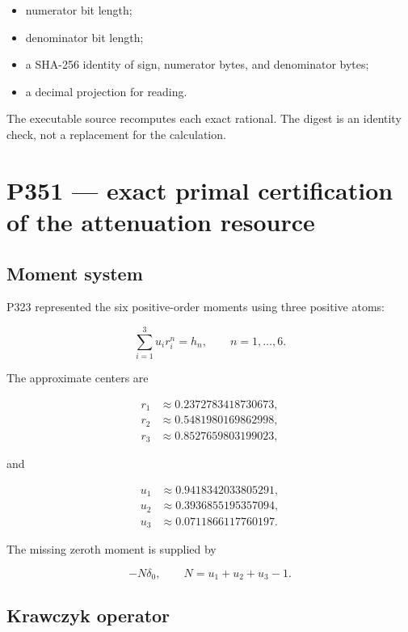 \documentclass[11pt,a4paper,openany]{report}
\begin{document}
\begin{itemize}
\item 
numerator bit length;

\item 
denominator bit length;

\item 
a SHA-256 identity of sign, numerator bytes, and denominator bytes;

\item 
a decimal projection for reading.

\end{itemize}

The executable source recomputes each exact rational. The digest is an identity check, not a replacement for the calculation.

\chapter{P351 --- exact primal certification of the attenuation resource}

\section{Moment system}

P323 represented the six positive-order moments using three positive atoms:

\[
\sum_{i=1}^{3}u_ir_i^n=h_n,
\qquad n=1,\ldots,6.
\]

The approximate centers are

\[
\begin{aligned}
r_1&\approx0.2372783418730673,\\
r_2&\approx0.5481980169862998,\\
r_3&\approx0.8527659803199023,
\end{aligned}
\]

and

\[
\begin{aligned}
u_1&\approx0.9418342033805291,\\
u_2&\approx0.3936855195357094,\\
u_3&\approx0.0711866117760197.
\end{aligned}
\]

The missing zeroth moment is supplied by

\[
-N\delta_0,
\qquad
N=u_1+u_2+u_3-1.
\]

\section{Krawczyk operator}
\end{document}
